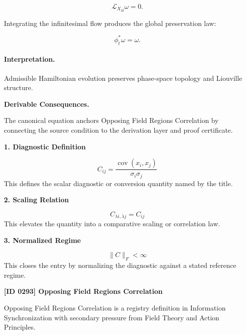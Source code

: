 \begin{equation}
\mathcal{L}_{X_H}\omega=0.
\end{equation}

Integrating the infinitesimal flow produces the global preservation law:

\begin{equation}
\boxed{
\phi_t^{*}\omega=\omega.
}
\end{equation}

\paragraph{Interpretation.}
Admissible Hamiltonian evolution preserves phase-space topology and Liouville structure.

\par\vspace{0.35em}
\noindent\textbf{Derivable Consequences.}\quad
\begingroup
\footnotesize
\raggedright
The canonical equation anchors Opposing Field Regions Correlation by connecting the source condition to the derivation layer and proof certificate.
\par\endgroup

\noindent\textbf{1. Diagnostic Definition}\par
\[
C_{ij} = \frac{\operatorname{cov}(x_i,x_j)}{\sigma_i\sigma_j}
\]
\noindent This defines the scalar diagnostic or conversion quantity named by the title.\par
\noindent\textbf{2. Scaling Relation}\par
\[
C_{\lambda i,\lambda j}=C_{ij}
\]
\noindent This elevates the quantity into a comparative scaling or correlation law.\par
\noindent\textbf{3. Normalized Regime}\par
\[
\|C\|_{F}<\infty
\]
\noindent This closes the entry by normalizing the diagnostic against a stated reference regime.\par

\clearpage
\noindent\textbf{[ID 0293] Opposing Field Regions Correlation}\par
\vspace{0.35em}
\begingroup\small
{}
Opposing Field Regions Correlation is a registry definition in Information Synchronization with secondary pressure from Field Theory and Action Principles.

